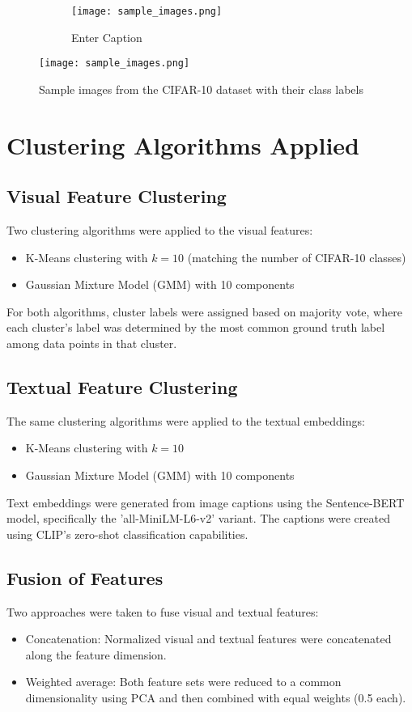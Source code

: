 \documentclass[12pt]{article}
\begin{document}
\begin{figure}[H]
    \centering
    \begin{figure}
        \centering
        \texttt{[image: sample\_images.png]}
        \caption{Enter Caption}
        \label{fig:enter-label}
    \end{figure}
    \texttt{[image: sample\_images.png]}
    \caption{Sample images from the CIFAR-10 dataset with their class labels}
    \label{fig:sample_images}
\end{figure}

\section{Clustering Algorithms Applied}

\subsection{Visual Feature Clustering}
Two clustering algorithms were applied to the visual features:
\begin{itemize}
    \item K-Means clustering with $k=10$ (matching the number of CIFAR-10 classes)
    \item Gaussian Mixture Model (GMM) with 10 components
\end{itemize}

For both algorithms, cluster labels were assigned based on majority vote, where each cluster's label was determined by the most common ground truth label among data points in that cluster.

\subsection{Textual Feature Clustering}
The same clustering algorithms were applied to the textual embeddings:
\begin{itemize}
    \item K-Means clustering with $k=10$ 
    \item Gaussian Mixture Model (GMM) with 10 components
\end{itemize}

Text embeddings were generated from image captions using the Sentence-BERT model, specifically the 'all-MiniLM-L6-v2' variant. The captions were created using CLIP's zero-shot classification capabilities.

\subsection{Fusion of Features}
Two approaches were taken to fuse visual and textual features:
\begin{itemize}
    \item Concatenation: Normalized visual and textual features were concatenated along the feature dimension.
    \item Weighted average: Both feature sets were reduced to a common dimensionality using PCA and then combined with equal weights (0.5 each).
\end{itemize}
\end{document}
